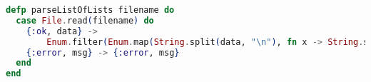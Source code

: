 \begin{lstlisting}[language=Elixir, caption=Splitting the lists with newlines and commas]
defp parseListOfLists filename do
  case File.read(filename) do
    {:ok, data} ->
        Enum.filter(Enum.map(String.split(data, "\n"), fn x -> String.split(x, ",") end), fn x -> x != [""] end)
    {:error, msg} -> {:error, msg}
  end
end
\end{lstlisting}